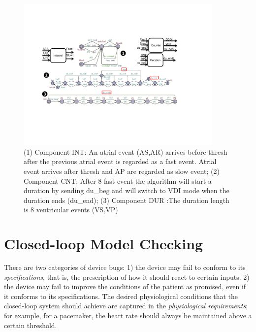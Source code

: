 \begin{figure}
		\centering
		\includegraphics[width=0.9\textwidth]{figs/duration.pdf}
		\vspace{-10pt}
		\caption{\small (1) Component \textsf{INT}: An atrial event (\textsf{AS,AR}) arrives before \textsf{thresh} after the previous atrial event is regarded as a \textsf{fast} event. Atrial event arrives after \textsf{thresh} and \textsf{AP} are regarded as \textsf{slow} event; (2) Component \textsf{CNT}: After 8 \textsf{fast} event the algorithm will start a duration by sending \textsf{du\_beg} and will switch to \textsf{VDI} mode when the duration ends (\textsf{du\_end}); (3) Component \textsf{DUR} :The duration length is 8 ventricular events (\textsf{VS,VP})}
		\label{fig:dur_count}
\end{figure} 


\chapter{Closed-loop Model Checking}
\label{ModelChecking}
There are two categories of device bugs: 
1) the device may fail to conform to its \emph{specifications}, that is, the prescription of how it should react to certain inputs.  
2) the device may fail to improve the conditions of the patient as promised, even if it conforms to its specifications. 
The desired physiological conditions that the closed-loop system should achieve are captured in the \emph{physiological requirements}; for example, for a pacemaker, the heart rate should always be maintained above a certain threshold. 

